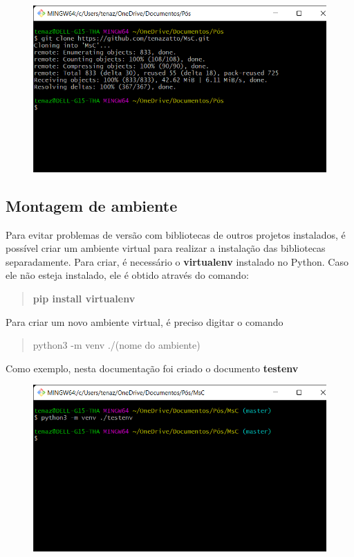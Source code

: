 \documentclass[letterpaper]{article}
\begin{document}
\begin{figure}[h!]
\centering
\includegraphics[scale=0.4]{images/git-clone.png}
\label{fig:DocInstallGitClone}
\end{figure}

\subsection{Montagem de ambiente}

Para evitar problemas de versão com bibliotecas de outros projetos instalados, é possível criar um ambiente virtual para realizar a instalação das bibliotecas separadamente. Para criar, é necessário o \textbf{virtualenv} instalado no Python. Caso ele não esteja instalado, ele é obtido através do comando:

\begin{quote}\textbf{pip install virtualenv}\end{quote}

Para criar um novo ambiente virtual, é preciso digitar o comando

\begin{quote}python3 -m venv ./(nome do ambiente)\end{quote}

Como exemplo, nesta documentação foi criado o documento \textbf{testenv}

\begin{figure}[h!]
\centering
\includegraphics[scale=0.4]{images/virtualenv-sh.png}
\label{fig:DocInstallVirtualEnvShell}
\end{figure}
\end{document}
